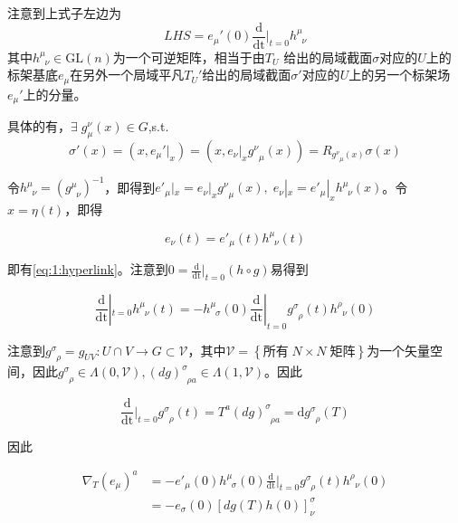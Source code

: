 \documentclass{ctexbook}
\begin{document}
注意到上式子左边为
\begin{equation}\label{eq:1:hyperlink}
    LHS=e_{\mu}'(0)\frac{\mathrm{d}}{\mathrm{dt}}|_{t=0}h^{\mu}_{\;\;\nu}
\end{equation}
其中$h^{\mu}_{\;\;\nu}\in \mathrm{GL}(n)$为一个可逆矩阵，相当于由$T_U$ 给出的局域截面$\sigma$对应的$U$上的标架基底$e_{\mu}$在另外一个局域平凡$T_U'$给出的局域截面$\sigma'$对应的$U$上的另一个标架场$e_{\mu}'$上的分量。

具体的有，$\exists\;g^{\nu}_{\mu}(x)\in G$,s.t.
\begin{equation}
    \sigma'(x)=(x,e_{\mu}'|_x)=(x,e_{\nu}|_x g^{\nu}_{\;\;\mu}(x))=R_{g^{\nu}_{\;\;\mu}(x)}\sigma(x)
\end{equation}

令$h^{\mu}_{\;\;\nu}=\left(g^{\mu}_{\;\;\nu}\right)^{-1}$，即得到$e'_{\mu}|_x=e_{\nu}|_x g^{\nu}_{\;\;\mu}(x),\;e_{\nu}|_x=e'_{\mu}|_x h^{\mu}_{\;\;\nu}(x)$。令$x=\eta(t)$，即得

\begin{equation}
    e_\nu(t)=e'_{\mu}(t)h^{\mu}_{\;\;\nu}(t)
\end{equation}

即有\eqref{eq:1:hyperlink}。注意到$0=\frac{\mathrm{d}}{\mathrm{dt}}|_{t=0}(h\circ g)$易得到

\begin{equation}
    \frac{\mathrm{d}}{\mathrm{dt}}|_{t=0}h^{\mu}_{\;\;\nu}(t)
    =-h^{\mu}_{\;\;\sigma}(0)\frac{\mathrm{d}}{\mathrm{dt}}|_{t=0}g^{\sigma}_{\;\;\rho}(t)h^{\rho}_{\;\;\nu}(0)
\end{equation}

注意到$g^{\sigma}_{\;\;\rho}=g_{UV}\colon U\cap V\to G\subset\mathscr{V}$，其中$\mathscr{V}=\left\{\text{所有}\;N\times N\;\text{矩阵}\right\}$为一个矢量空间，因此$g^{\sigma}_{\;\;\rho}\in\Lambda(0,\mathscr{V}),(dg)^{\sigma}_{\;\;\rho a}\in\Lambda(1,\mathscr{V})$。因此

\begin{equation}
    \frac{\mathrm{d}}{\mathrm{dt}}|_{t=0}g^{\sigma}_{\;\;\rho}(t)=T^{a}(dg)^{\sigma}_{\;\;\rho a}=\mathrm{d}g^{\sigma}_{\;\;\rho}(T)
\end{equation}

因此

\begin{equation}
    \begin{split}
        \nabla_{T}(e_\mu)^a
        &=-e'_\mu(0)h^{\mu}_{\;\;\sigma}(0)\frac{\mathrm{d}}{\mathrm{dt}}|_{t=0}g^{\sigma}_{\;\;\rho}(t)h^{\rho}_{\;\;\nu}(0)\\
        &=-e_{\sigma}(0)[dg(T)h(0)]^{\sigma}_{\nu}
    \end{split}
\end{equation}
\end{document}
